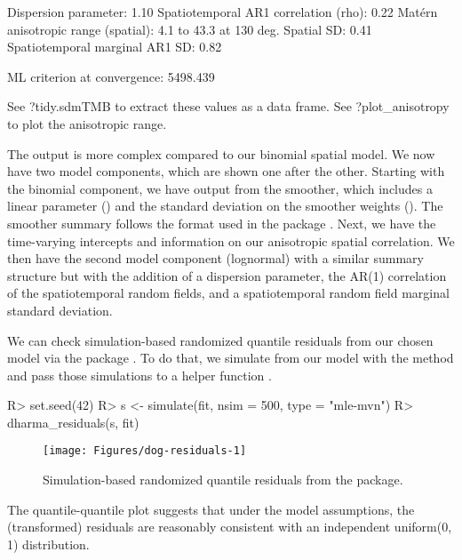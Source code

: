 \documentclass[article]{jss}\usepackage[]{graphicx}\usepackage[dvipsnames]{xcolor}
\newcommand{\fct}[1]{\code{#1()}}
\begin{document}
\begin{Schunk}
\begin{Soutput}
Dispersion parameter: 1.10
Spatiotemporal AR1 correlation (rho): 0.22
Matérn anisotropic range (spatial): 4.1 to 43.3 at 130 deg.
Spatial SD: 0.41
Spatiotemporal marginal AR1 SD: 0.82

ML criterion at convergence: 5498.439

See ?tidy.sdmTMB to extract these values as a data frame.
See ?plot_anisotropy to plot the anisotropic range.
\end{Soutput}
\end{Schunk}

The output is more complex compared to our binomial spatial model.
We now have two model components, which are shown one after the other.
Starting with the binomial component, we have output from the smoother, which includes a linear parameter () and the standard deviation on the smoother weights ().
The smoother summary follows the format used in the  package \citep{brms}.
Next, we have the time-varying intercepts and information on our anisotropic spatial correlation.
We then have the second model component (lognormal) with a similar summary structure but with the addition of a dispersion parameter, the AR(1) correlation of the spatiotemporal random fields, and a spatiotemporal random field marginal standard deviation.

We can check simulation-based randomized quantile residuals from our chosen model via the  package \citep{dharma}.
To do that, we simulate from our model with the \fct{simulate.sdmTMB} method and pass those simulations to a helper function \fct{dharma\_residuals}.

\begin{Schunk}
\begin{Sinput}
R> set.seed(42)
R> s <- simulate(fit, nsim = 500, type = "mle-mvn")
R> dharma_residuals(s, fit)
\end{Sinput}
\begin{figure}[ht]

{\centering \texttt{[image: Figures/dog-residuals-1]}

}

\caption[Simulation-based randomized quantile residuals from the  package]{Simulation-based randomized quantile residuals from the  package.}\label{fig:dog-residuals}
\end{figure}
\end{Schunk}

The quantile-quantile plot suggests that under the model assumptions, the (transformed) residuals are reasonably consistent with an independent uniform(0, 1) distribution.
\end{document}
